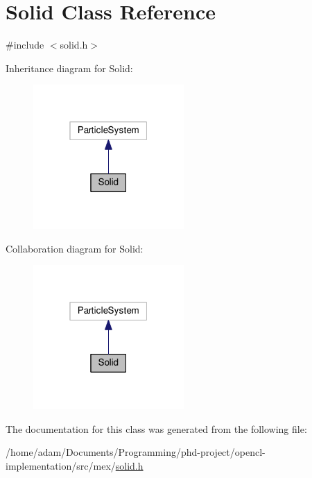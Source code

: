 \hypertarget{classSolid}{}\section{Solid Class Reference}
\label{classSolid}


{\ttfamily \#include $<$solid.\+h$>$}



Inheritance diagram for Solid\+:\nopagebreak
\begin{figure}[H]
\begin{center}
\leavevmode
\includegraphics[width=163pt]{classSolid__inherit__graph}
\end{center}
\end{figure}


Collaboration diagram for Solid\+:\nopagebreak
\begin{figure}[H]
\begin{center}
\leavevmode
\includegraphics[width=163pt]{classSolid__coll__graph}
\end{center}
\end{figure}


The documentation for this class was generated from the following file\+:\begin{DoxyCompactItemize}
\item 
/home/adam/\+Documents/\+Programming/phd-\/project/opencl-\/implementation/src/mex/\hyperlink{solid_8h}{solid.\+h}\end{DoxyCompactItemize}

